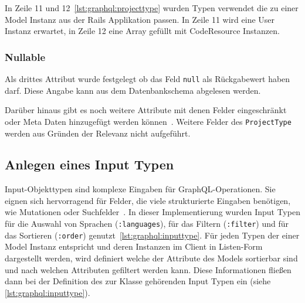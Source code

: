 In Zeile 11 und 12~\ref{lst:graphql:projecttype} wurden Typen verwendet die zu einer Model Instanz aus der Rails Applikation passen. In Zeile 11 wird eine User Instanz erwartet, in Zeile 12 eine Array gefüllt mit CodeResource Instanzen.

\subsubsection{Nullable}
Als drittes Attribut wurde festgelegt ob das Feld \lstinline|null| als Rückgabewert haben darf. Diese Angabe kann aus dem Datenbankschema abgelesen werden.

Darüber hinaus gibt es noch  weitere Attribute mit denen Felder eingeschränkt oder Meta Daten hinzugefügt werden können~\cite{graphql-field-introduction}.
Weitere Felder des \lstinline|ProjectType| werden aus Gründen der Relevanz nicht aufgeführt. 

\subsection{Anlegen eines Input Typen}
\label{impl:graphql:input}
\label{graphql:inputtypes}
Input-Objekttypen sind komplexe Eingaben für GraphQL-Operationen. Sie eignen sich hervorragend für Felder, die viele strukturierte Eingaben benötigen, wie Mutationen oder Suchfelder~\cite{graphql-input-type}.
In dieser Implementierung wurden Input Typen für die Auswahl von Sprachen (\lstinline|:languages|), für das Filtern (\lstinline|:filter|) und für das Sortieren (\lstinline|:order|) genutzt~\ref{lst:graphql:inputtype}.
Für jeden Typen der einer Model Instanz entspricht und deren Instanzen im Client in Listen-Form dargestellt werden, wird definiert welche der Attribute des Models sortierbar sind und nach welchen Attributen gefiltert werden kann. Diese Informationen fließen dann bei der Definition des zur Klasse gehörenden Input Typen ein (siehe \ref{lst:graphql:inputtype}).


